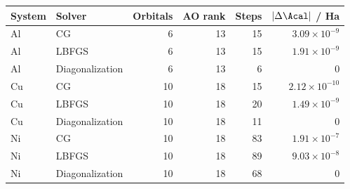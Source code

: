\begin{tabular}{llrrrr}\toprule
System & Solver & Orbitals & AO rank & Steps & $|\Delta\Acal|$ / Ha\\\midrule
Al & CG & 6 & 13 & 15 & $3.09\times10^{-9}$\\
Al & LBFGS & 6 & 13 & 15 & $1.91\times10^{-9}$\\
Al & Diagonalization & 6 & 13 & 6 & $0$\\
Cu & CG & 10 & 18 & 15 & $2.12\times10^{-10}$\\
Cu & LBFGS & 10 & 18 & 20 & $1.49\times10^{-9}$\\
Cu & Diagonalization & 10 & 18 & 11 & $0$\\
Ni & CG & 10 & 18 & 83 & $1.91\times10^{-7}$\\
Ni & LBFGS & 10 & 18 & 89 & $9.03\times10^{-8}$\\
Ni & Diagonalization & 10 & 18 & 68 & $0$\\
\bottomrule\end{tabular}
